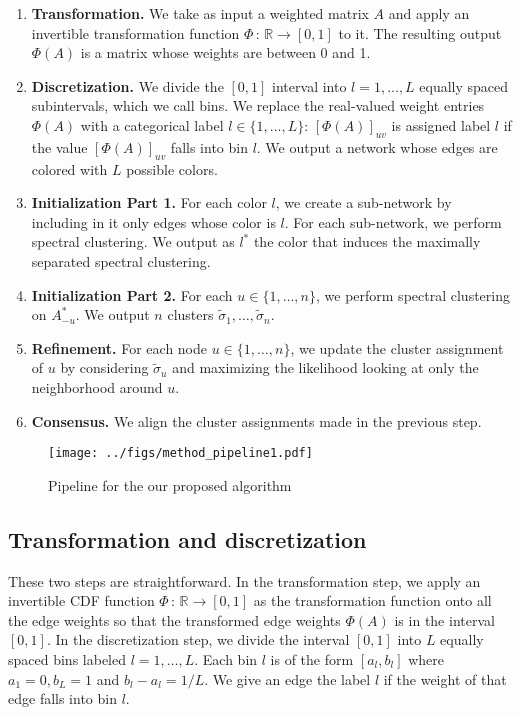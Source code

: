 \begin{enumerate}
\item \textbf{Transformation.} We take as input a weighted matrix $A$ and apply an invertible transformation function $\Phi \,:\, \mathbb{R} \rightarrow [0,1]$ to it. The resulting output $\Phi(A)$ is a matrix whose weights are between 0 and 1.
\item \textbf{Discretization.} We divide the $[0,1]$ interval into $l=1,...,L$ equally spaced subintervals, which we call bins. We replace the real-valued weight entries $\Phi(A)$ with a categorical label $l \in \{1,...,L\}$: $[\Phi(A)]_{uv}$ is assigned label $l$ if the value $[\Phi(A)]_{uv}$ falls into bin $l$. We output a network whose edges are colored with $L$ possible colors. 
\item \textbf{Initialization Part 1.} For each color $l$, we create a sub-network by including in it only edges whose color is $l$. For each sub-network, we perform spectral clustering. We output as $l^*$ the color that induces the maximally separated spectral clustering. 
\item \textbf{Initialization Part 2.} For each $u \in \{1, \dots, n\}$, we perform spectral clustering on $A^*_{-u}$. We output $n$ clusters $\tilde{\sigma}_1, \dots, \tilde{\sigma}_n$. 
\item \textbf{Refinement.} For each node $u \in \{1, \dots, n\}$, we update the cluster assignment of $u$ by considering $\tilde{\sigma}_u$ and  maximizing the likelihood looking at only the neighborhood around $u$. 
\item \textbf{Consensus.} We align the cluster assignments made in the previous step. 
\end{enumerate}

 
\begin{figure}[htp]
\centering
\texttt{[image: ../figs/method\_pipeline1.pdf]}
\caption{Pipeline for the our proposed algorithm}
\label{fig:method_pipeline1}
\end{figure}



\subsection{Transformation and discretization}

These two steps are straightforward. In the transformation step, we apply an invertible CDF function $\Phi \,:\, \mathbb{R} \rightarrow [0,1]$ as the transformation function onto all the edge weights so that the transformed edge weights $\Phi(A)$ is in the interval $[0,1]$. In the discretization step, we divide the interval $[0,1]$ into $L$ equally spaced bins labeled $l=1, \dots, L$. Each bin $l$ is of the form $[a_l, b_l]$ where $a_1 = 0, b_L = 1$ and $b_l - a_l = 1/L$. We give an edge the label $l$ if the weight of that edge falls into bin $l$. 


